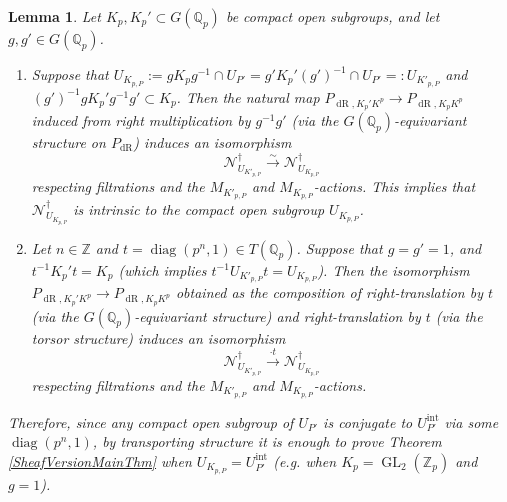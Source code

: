 \documentclass[10pt, oneside]{amsart}
\numberwithin{equation}{subsection}
\newtheorem{lemma}[equation]{Lemma}
\theoremstyle{definition}
\theoremstyle{remark}
\newcommand{\mbb}[1]{\mathbb{#1}}
\newcommand{\opn}[1]{\operatorname{#1}}
\begin{document}
\begin{lemma}
Let $K_p, K_p' \subset G(\mbb{Q}_p)$ be compact open subgroups, and let $g, g' \in G(\mbb{Q}_p)$.
\begin{enumerate}
    \item Suppose that $U_{K_{p, P}} := g K_p g^{-1} \cap U_{P'} = g' K_p' (g')^{-1} \cap U_{P'} =: U_{K'_{p, P}}$ and $(g')^{-1}g K_p' g^{-1}g' \subset K_p$. Then the natural map $P_{\opn{dR}, K_p' K^p} \to P_{\opn{dR}, K_p K^p}$ induced from right multiplication by $g^{-1}g'$ (via the $G(\mbb{Q}_p)$-equivariant structure on $P_{\opn{dR}}$) induces an isomorphism
    \[
    \mathscr{N}^{\dagger}_{U_{K'_{p, P}}} \xrightarrow{\sim} \mathscr{N}^{\dagger}_{U_{K_{p, P}}}
    \]
    respecting filtrations and the $M_{K'_{p, P}}$ and $M_{K_{p, P}}$-actions. This implies that $\mathscr{N}^{\dagger}_{U_{K_{p, P}}}$ is intrinsic to the compact open subgroup $U_{K_{p, P}}$.
    \item Let $n \in \mbb{Z}$ and $t = \opn{diag}(p^n, 1) \in T(\mbb{Q}_p)$. Suppose that $g = g' = 1$, and $t^{-1}K_p't = K_p$ (which implies $t^{-1}U_{K'_{p, P}} t = U_{K_{p, P}}$). Then the isomorphism $P_{\opn{dR}, K_p'K^p} \to P_{\opn{dR}, K_p K^p}$ obtained as the composition of right-translation by $t$ (via the $G(\mbb{Q}_p)$-equivariant structure) and right-translation by $t$ (via the torsor structure) induces an isomorphism
    \[
    \mathscr{N}^{\dagger}_{U_{K'_{p, P}}} \xrightarrow{\cdot t} \mathscr{N}^{\dagger}_{U_{K_{p, P}}}
    \]
    respecting filtrations and the $M_{K'_{p, P}}$ and $M_{K_{p, P}}$-actions.
\end{enumerate}
Therefore, since any compact open subgroup of $U_{P'}$ is conjugate to $U_{P'}^{\opn{int}}$ via some $\opn{diag}(p^n, 1)$, by transporting structure it is enough to prove Theorem \ref{SheafVersionMainThm} when $U_{K_{p, P}} = U_{P'}^{\opn{int}}$ (e.g. when $K_p = \opn{GL}_2(\mbb{Z}_p)$ and $g=1$).
\end{lemma}
\end{document}
